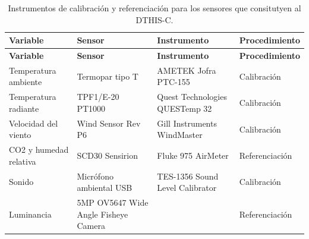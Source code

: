 \documentclass[
  letterpaper,
]{scrbook}
\begin{document}
\begin{longtable}[]{@{}
  >{\raggedright\arraybackslash}p{}
  >{\raggedright\arraybackslash}p{}
  >{\raggedright\arraybackslash}p{}
  >{\raggedright\arraybackslash}p{}@{}}
\caption{Instrumentos de calibración y referenciación para los sensores
que consitutyen al DTHIS-C.}\label{tbl-instrumentos}\tabularnewline
\toprule\noalign{}
\begin{minipage}[b]{\linewidth}\raggedright
\textbf{Variable}
\end{minipage} & \begin{minipage}[b]{\linewidth}\raggedright
\textbf{Sensor}
\end{minipage} & \begin{minipage}[b]{\linewidth}\raggedright
\textbf{Instrumento}
\end{minipage} & \begin{minipage}[b]{\linewidth}\raggedright
\textbf{Procedimiento}
\end{minipage} \\
\midrule\noalign{}
\endfirsthead
\toprule\noalign{}
\begin{minipage}[b]{\linewidth}\raggedright
\textbf{Variable}
\end{minipage} & \begin{minipage}[b]{\linewidth}\raggedright
\textbf{Sensor}
\end{minipage} & \begin{minipage}[b]{\linewidth}\raggedright
\textbf{Instrumento}
\end{minipage} & \begin{minipage}[b]{\linewidth}\raggedright
\textbf{Procedimiento}
\end{minipage} \\
\midrule\noalign{}
\endhead
\bottomrule\noalign{}
\endlastfoot
Temperatura ambiente & Termopar tipo T & AMETEK Jofra PTC-155 &
Calibración \\
Temperatura radiante & TPF1/E-20 PT1000 & Quest Technologies QUESTemp 32
& Calibración \\
Velocidad del viento & Wind Sensor Rev P6 & Gill Instruments WindMaster
& Calibración \\
CO2 y humedad relativa & SCD30 Sensirion & Fluke 975 AirMeter &
Referenciación \\
Sonido & Micrófono ambiental USB & TES-1356 Sound Level Calibrator &
Calibración \\
Luminancia & 5MP OV5647 Wide Angle Fisheye Camera & & Referenciación \\
\end{longtable}
\end{document}
